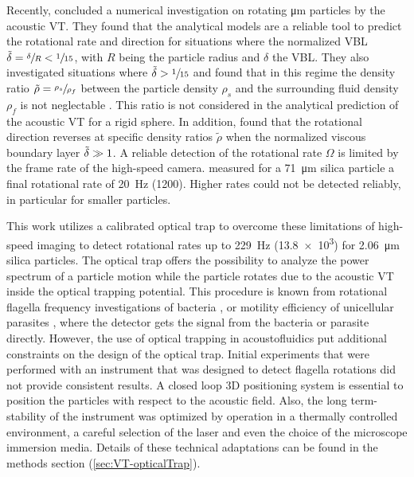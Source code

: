 Recently, \citeauthor{Hahn2016} \cite{Hahn2016} concluded a numerical 
investigation on rotating \si{\micro\meter} particles by the acoustic VT\@. They 
found that the analytical models are a reliable tool to predict the rotational 
rate and direction for situations where the normalized VBL 
$\tilde{\delta} = \sfrac{\delta}{R} < \sfrac{1}{15}$, with $R$ being the particle 
radius and $\delta$ the VBL. They also investigated 
situations where $\tilde{\delta} > \sfrac{1}{15}$ and found that in this regime 
the density ratio $\tilde{\rho} = \sfrac{\rho_{s}}{\rho_{f}}$ between the 
particle density $\rho_{s}$ and the surrounding fluid density $\rho_{f}$ is not 
neglectable \cite{Hahn2016}. This ratio is not considered in the analytical 
prediction of the acoustic VT for a rigid sphere. In addition, 
\citeauthor{Hahn2016} \cite{Hahn2016} found that the rotational direction 
reverses at specific density ratios $\tilde{\rho}$ when the normalized viscous 
boundary layer $\tilde{\delta} \gg 1$. A reliable detection of the rotational rate 
$\Omega$ is limited by the frame rate of the high-speed camera.  
\citeauthor{Lamprecht2013} \cite{Lamprecht2013} measured for a \SI{71}{\micro\meter} 
silica particle a final rotational rate of \SI{20}{\hertz} (\SI{1200}{\rpm}).  
Higher rates could not be detected reliably, in particular for smaller 
particles.

This work utilizes a calibrated optical trap to overcome these limitations of 
high-speed imaging to detect rotational rates up to \SI{229}{\hertz} 
(\SI{13.8e3}{\rpm}) for \SI{2.06}{\micro\meter} silica particles. The optical 
trap offers the possibility to analyze the power spectrum of a particle motion 
while the particle rotates due to the acoustic VT inside the optical trapping 
potential.  This procedure is known from rotational flagella frequency 
investigations of bacteria \cite{Kirchner2014}, or motility efficiency of 
unicellular parasites \cite{Stellamanns2014}, where the detector gets the 
signal from the bacteria or parasite directly. However, the use of optical 
trapping in acoustofluidics put additional constraints on the design of the 
optical trap.  Initial experiments that were performed with an instrument that 
was designed to detect flagella rotations did not provide consistent results. A 
closed loop 3D positioning system is essential to position the particles with 
respect to the acoustic field. Also, the long term-stability of the instrument 
was optimized by operation in a thermally controlled environment, a careful 
selection of the laser and even the choice of the microscope immersion media.  
Details of these technical adaptations can be found in the methods section 
(\ref{sec:VT-opticalTrap}).

